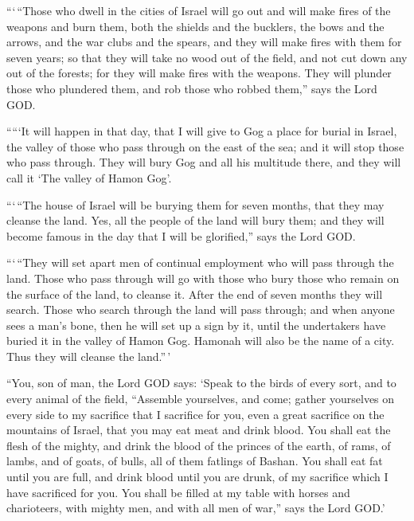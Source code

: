  ```\,``Those who dwell in the cities of Israel will go out
and will make fires of the weapons and burn them, both the shields and
the bucklers, the bows and the arrows, and the war clubs and the spears,
and they will make fires with them for seven years;  so
that they will take no wood out of the field, and not cut down any out
of the forests; for they will make fires with the weapons. They will
plunder those who plundered them, and rob those who robbed them,'' says
the Lord GOD.

 `````It will happen in that day, that I will give to Gog a
place for burial in Israel, the valley of those who pass through on the
east of the sea; and it will stop those who pass through. They will bury
Gog and all his multitude there, and they will call it `The valley of
Hamon Gog'.

 ```\,``The house of Israel will be burying them for seven
months, that they may cleanse the land.  Yes, all the
people of the land will bury them; and they will become famous in the
day that I will be glorified,'' says the Lord GOD.

 ```\,``They will set apart men of continual employment who
will pass through the land. Those who pass through will go with those
who bury those who remain on the surface of the land, to cleanse it.
After the end of seven months they will search.  Those who
search through the land will pass through; and when anyone sees a man's
bone, then he will set up a sign by it, until the undertakers have
buried it in the valley of Hamon Gog.  Hamonah will also be
the name of a city. Thus they will cleanse the land.''\,'

 ``You, son of man, the Lord GOD says: `Speak to the birds
of every sort, and to every animal of the field, ``Assemble yourselves,
and come; gather yourselves on every side to my sacrifice that I
sacrifice for you, even a great sacrifice on the mountains of Israel,
that you may eat meat and drink blood.  You shall eat the
flesh of the mighty, and drink the blood of the princes of the earth, of
rams, of lambs, and of goats, of bulls, all of them fatlings of Bashan.
 You shall eat fat until you are full, and drink blood
until you are drunk, of my sacrifice which I have sacrificed for you.
 You shall be filled at my table with horses and
charioteers, with mighty men, and with all men of war,'' says the Lord
GOD.'

